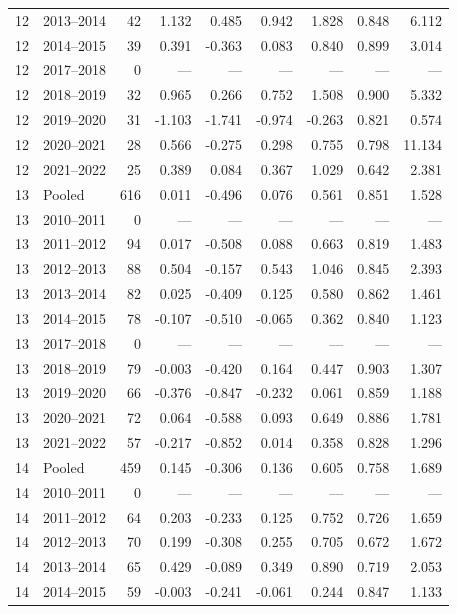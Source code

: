 \begin{longtable}{llrrrrrrr}
12 & 2013--2014 & 42 & 1.132 & 0.485 & 0.942 & 1.828 & 0.848 & 6.112 \\
12 & 2014--2015 & 39 & 0.391 & -0.363 & 0.083 & 0.840 & 0.899 & 3.014 \\
12 & 2017--2018 & 0 & --- & --- & --- & --- & --- & --- \\
12 & 2018--2019 & 32 & 0.965 & 0.266 & 0.752 & 1.508 & 0.900 & 5.332 \\
12 & 2019--2020 & 31 & -1.103 & -1.741 & -0.974 & -0.263 & 0.821 & 0.574 \\
12 & 2020--2021 & 28 & 0.566 & -0.275 & 0.298 & 0.755 & 0.798 & 11.134 \\
12 & 2021--2022 & 25 & 0.389 & 0.084 & 0.367 & 1.029 & 0.642 & 2.381 \\
13 & Pooled & 616 & 0.011 & -0.496 & 0.076 & 0.561 & 0.851 & 1.528 \\
13 & 2010--2011 & 0 & --- & --- & --- & --- & --- & --- \\
13 & 2011--2012 & 94 & 0.017 & -0.508 & 0.088 & 0.663 & 0.819 & 1.483 \\
13 & 2012--2013 & 88 & 0.504 & -0.157 & 0.543 & 1.046 & 0.845 & 2.393 \\
13 & 2013--2014 & 82 & 0.025 & -0.409 & 0.125 & 0.580 & 0.862 & 1.461 \\
13 & 2014--2015 & 78 & -0.107 & -0.510 & -0.065 & 0.362 & 0.840 & 1.123 \\
13 & 2017--2018 & 0 & --- & --- & --- & --- & --- & --- \\
13 & 2018--2019 & 79 & -0.003 & -0.420 & 0.164 & 0.447 & 0.903 & 1.307 \\
13 & 2019--2020 & 66 & -0.376 & -0.847 & -0.232 & 0.061 & 0.859 & 1.188 \\
13 & 2020--2021 & 72 & 0.064 & -0.588 & 0.093 & 0.649 & 0.886 & 1.781 \\
13 & 2021--2022 & 57 & -0.217 & -0.852 & 0.014 & 0.358 & 0.828 & 1.296 \\
14 & Pooled & 459 & 0.145 & -0.306 & 0.136 & 0.605 & 0.758 & 1.689 \\
14 & 2010--2011 & 0 & --- & --- & --- & --- & --- & --- \\
14 & 2011--2012 & 64 & 0.203 & -0.233 & 0.125 & 0.752 & 0.726 & 1.659 \\
14 & 2012--2013 & 70 & 0.199 & -0.308 & 0.255 & 0.705 & 0.672 & 1.672 \\
14 & 2013--2014 & 65 & 0.429 & -0.089 & 0.349 & 0.890 & 0.719 & 2.053 \\
14 & 2014--2015 & 59 & -0.003 & -0.241 & -0.061 & 0.244 & 0.847 & 1.133 \\

\end{longtable}
